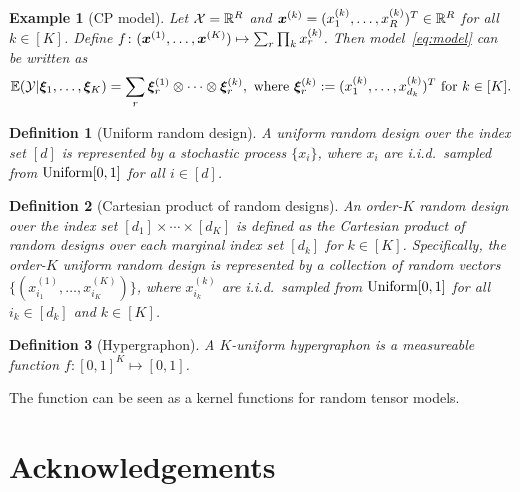 \documentclass{article}
\newtheorem{defn}{Definition}
\newtheorem{exam}{Example}
\begin{document}
\begin{exam}[CP model] Let $\mathcal{X}=\mathbb{R}^R$ and $\bm x^{(k)}=(x^{(k)}_{1},\ldots,x^{(k)}_{R})^T\in\mathbb{R}^R$ for all $k\in[K]$. Define $f \colon (\bm x^{(1)},\ldots,\bm x^{(K)})\mapsto \sum_{r} \prod_{k} x^{(k)}_r$. Then model~\eqref{eq:model} can be written as
\[
\mathbb{E}(\tY | \mxi_1,\ldots,\mxi_K)=\sum_r \mxi^{(1)}_r\otimes \cdots\otimes \mxi^{(k)}_r, \ \text{where}\ \mxi^{(k)}_r:=(x^{(k)}_{1},\ldots,x^{(k)}_{d_k})^T \  \text{for }k\in[K].
\]
\end{exam}

\begin{defn}[Uniform random design] A uniform random design over the index set $[d]$ is represented by a stochastic process $\{x_i\}$, where $x_i$ are i.i.d.\ sampled from $\textup{Uniform}[0,1]$ for all $i\in[d]$.
\end{defn}

\begin{defn}[Cartesian product of random designs] An order-$K$ random design over the index set $[d_1]\times \cdots \times [d_K]$ is defined as the Cartesian product of random designs over each marginal index set $[d_k]$ for $k\in[K]$. Specifically, the order-$K$ uniform random design is represented by a collection of random vectors $\{(x^{(1)}_{i_1},\ldots,x^{(K)}_{i_K})\}$, where $x^{(k)}_{i_k}$ are i.i.d.\ sampled from $\textup{Uniform}[0,1]$ for all $i_k\in[d_k]$ and $k\in[K]$.
\end{defn}

\begin{defn}[Hypergraphon] A $K$-uniform hypergraphon is a measureable function $f\colon [0,1]^K\mapsto [0,1]$. 
\end{defn}
The function can be seen as a kernel functions for random tensor models. 
\section*{Acknowledgements}



\end{document}
